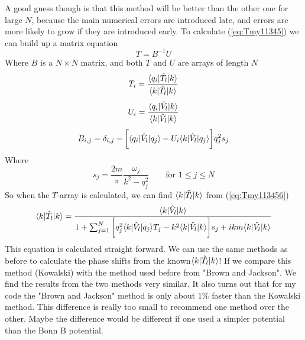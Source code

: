A good guess though is that this method will be better than the other one for large $N$, because the main numerical errors are introduced late, 
and errors are more likely to grow if they are introduced early.
\nl
To calculate (\ref{eq:Tmy11345}) we can build up a matrix equation
\begin{equation}
T=B^{-1}U
\end{equation}
Where $B$ is a $N\times N$ matrix, and both $T$ and $U$ are arrays of length $N$ 
\begin{equation}
T_i=\frac{\langle{ q_i}|\hat{T}_l|{ k}\rangle}{\langle k|\hat{T}_l| k\rangle} 
\end{equation}
\begin{equation}
U_{i}=\frac{\langle q_i|\hat{V}_l| k\rangle }{\langle k|\hat{V}_l|k\rangle }
\end{equation}
\begin{equation}
B_{i,j}=\delta_{i,j}-
\bigg[\langle{ q_i}|\hat{V}_l|{{ q}_j}\rangle-U_{i}{\langle{ k}|\hat{V}_l|{ q_j}\rangle }\bigg]q^2_j s_j
\end{equation}
Where  
\begin{equation}
s_j=\frac{2m}{\pi} \frac{\omega_j}{k^2-{ q^2_j}}  \qquad\textrm{for $1\le j\le N$}
\end{equation}
So when the $T$-array is calculated, we can find $\langle{ k}|\hat{T_l}|{ k}\rangle$ from (\ref{eq:Tmy113456})
\begin{equation}
\langle{ k}|\hat{T_l}|{ k}\rangle
=\frac{\langle k|\hat{V}_l|k\rangle}{1+\sum_{j=1}^N\bigg[q^2_j\langle k|\hat{V}_l|q_j\rangle T_j-k^2\langle k|\hat{V}_l|k\rangle \bigg] s_j
+i { k}m \langle{ k}|\hat{V_l}|{ k}\rangle} 
\end{equation}
This equation is calculated straight forward. 
We can use the same methods as before
to calculate the phase shifts from the known$\langle{ k}|\hat{T_l}|{ k}\rangle$!
\nl
If we compare this method (Kowalski) with the method used before from "Brown and Jackson". We find the results from 
the two methods very similar. It also turns out that for my code the "Brown and Jackson" method is only about 1$\%$ faster 
than the Kowalski method. This difference is really too small to recommend one method over the other.
Maybe the difference would be different if one used a simpler
potential than the Bonn B potential. 

